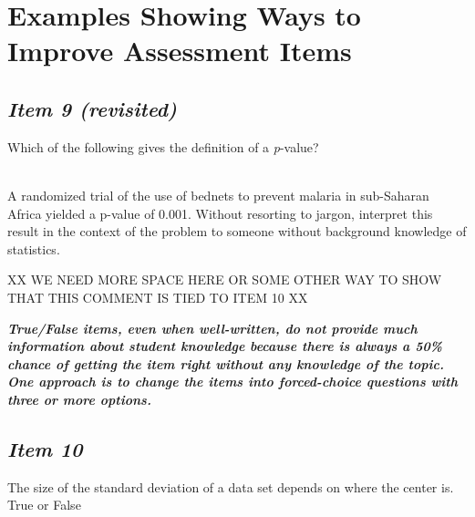 \section{\textbf{Examples Showing Ways to Improve Assessment Items}}


\subsection{\textbf{\textit{Item 9 (revisited)}}}


Which of the following gives the definition of a \textit{p}-value?


\vspace{8pt}





\noindent{} \\


A randomized trial of the
use of bednets to prevent malaria in sub-Saharan Africa yielded a p-value of 0.001. Without resorting to jargon, interpret this result in the context of the problem to someone without background knowledge of statistics.





\vspace{8pt} XX WE NEED MORE SPACE HERE OR SOME OTHER WAY TO SHOW THAT THIS COMMENT IS TIED TO ITEM 10 XX


\textbf{\textit{True/False items, even when well-written, do not provide much information about student knowledge because there is always a 50\% chance of getting the item right without any knowledge of the topic. One approach is to change the items into forced-choice questions with three or more options.}}





\subsection{\textbf{\textit{Item 10}}}


The size of the standard deviation of a data set depends on where the center is. True or False\\


